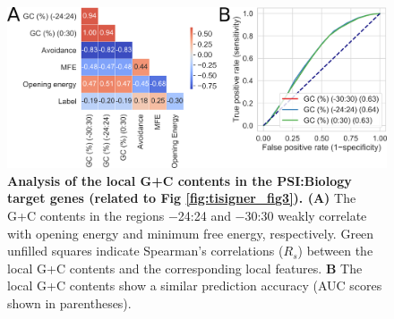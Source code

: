 \begin{figure}[htbp!]
	\center
	\includegraphics[width=1\textwidth]{appendix/TIsigner/Figs/S9.png}
	\caption[Analysis of the local G+C contents in the PSI:Biology target genes (related to Fig \ref{fig:tisigner_fig3}).]{\textbf{Analysis of the local G+C contents in the PSI:Biology target genes (related to Fig \ref{fig:tisigner_fig3}). (A) }  The G+C contents in the regions −24:24 and −30:30 weakly correlate with opening energy and minimum free energy, respectively. Green unfilled squares indicate Spearman’s correlations ($R_s$) between the local G+C contents and the corresponding local features. \textbf{B}  The local G+C contents show a similar prediction accuracy (AUC scores shown in parentheses).
	}%
	\label{fig:appendix_TIsigner_S9}
\end{figure}




